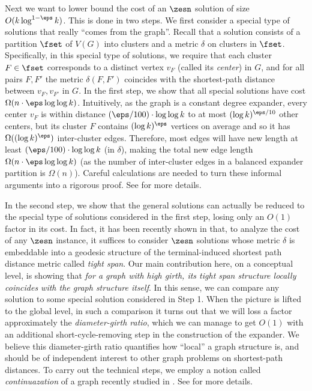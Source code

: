 Next we want to lower bound the cost of an $\zesn$ solution of size $O(k\log^{1-\eps} k)$. This is done in two steps. We first consider a special type of solutions that really ``comes from the graph''. Recall that a solution consists of a partition $\fset$ of $V(G)$ into clusters and a metric $\delta$ on clusters in $\fset$. Specifically, in this special type of solutions, we require that each cluster $F\in \fset$ corresponds to a distinct vertex $v_F$ (called its \emph{center}) in $G$, and for all pairs $F,F'$ the metric $\delta(F,F')$ coincides with the shortest-path distance between $v_F, v_{F'}$ in $G$.
In the first step, we show that all special solutions have cost $\Omega(n\cdot \eps \log\log k)$. Intuitively, as the graph is a constant degree expander, every center $v_F$ is within distance $(\eps/100)\cdot \log\log k$ to at most $(\log k)^{\eps/10}$ other centers, but its cluster $F$ contains $(\log k)^{\eps}$ vertices on average and so it has $\Omega((\log k)^{\eps})$ inter-cluster edges. Therefore, most edges will have new length at least $(\eps/100)\cdot \log\log k$ (in $\delta$), making the total new edge length $\Omega(n \cdot \eps \log\log k)$ (as the number of inter-cluster edges in a balanced expander partition is $\Omega(n)$). Careful calculations are needed to turn these informal arguments into a rigorous proof. See  for more details.

In the second step, we show that the general solutions can actually be reduced to the special type of solutions considered in the first step, losing only an $O(1)$ factor in its cost. In fact, it has been recently shown in \cite{chen20241+} that, to analyze the cost of any $\zesn$ instance, it suffices to consider $\zesn$ solutions whose metric $\delta$ is embeddable into a geodesic structure of the terminal-induced shortest path distance metric called \emph{tight span}. Our main contribution here, on a conceptual level, is showing that \emph{for a graph with high girth, its tight span structure locally coincides with the graph structure itself}. In this sense, we can compare any solution to some special solution considered in Step 1. When the picture is lifted to the global level, in such a comparison it turns out that we will loss a factor approximately the \emph{diameter-girth ratio}, which we can manage to get $O(1)$ with an additional short-cycle-removing step in the construction of the expander. We believe this diameter-girth ratio quantifies how ``local'' a graph structure is, and should be of independent interest to other graph problems on shortest-path distances.
To carry out the technical steps, we employ a notion called \emph{continuazation} of a graph recently studied in \cite{chen2023towards}.
See  for more details.


